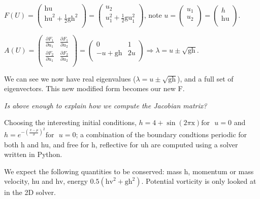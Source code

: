 \documentclass{article}
\begin{document}
\(F(U)=\left(
\begin{array}{c}
 \text{hu} \\
 \text{hu}^2+\frac{1}{2}\text{gh}^2 \\
\end{array}
\right)=\left(
\begin{array}{c}
 u_2 \\
 u_1^2+\frac{1}{2}\text{gu}_1^2 \\
\end{array}
\right)\), note \(u=\left(
\begin{array}{c}
 u_1 \\
 u_2 \\
\end{array}
\right)=\left(
\begin{array}{c}
 h \\
 \text{hu} \\
\end{array}
\right)\). 

\(A(U)=\left(
\begin{array}{cc}
 \frac{\partial F_1}{\partial u_1} & \frac{\partial F_1}{\partial u_2} \\
 \frac{\partial F_2}{\partial u_1} & \frac{\partial F_2}{\partial u_2} \\
\end{array}
\right)=\left(
\begin{array}{cc}
 0 & 1 \\
 -u+\text{gh} & 2u \\
\end{array}
\right)\Rightarrow \lambda =u\pm \sqrt{\text{gh}}.\)

We can see we now have real eigenvalues (\(\lambda =u\pm \sqrt{\text{gh}}\)), and a full set of eigenvectors. This new modified form becomes our
new F.

\textit{ Is above enough to explain how we compute the Jacobian matrix?}

Choosing the interesting initial conditions, \(h=4+\sin (2\text{$\pi $x}) \text{for}\text{  }u=0\) and \(h=e^{-\left(\frac{x-\mu }{\sigma }\right)^2}
\text{for}\text{  }u=0\); a combination of the boundary condtions periodic for both h and hu, and free for h, reflective for uh are computed using
a solver written in Python.


We expect the following quantities to be conserved: mass h, momentum or mass velocity, hu and hv, energy \(0.5\left(\text{hv}^2+\text{gh}^2\right)\).
Potential vorticity is only looked at in the 2D solver. 
\end{document}
